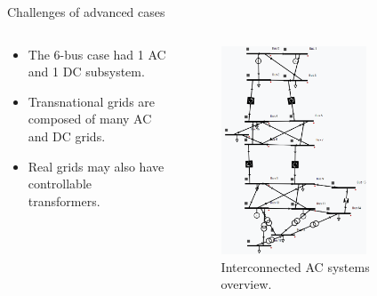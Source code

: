 \begin{frame}{Challenges of advanced cases}
    \begin{columns}
        
        \begin{column}{0.49\textwidth}
            \begin{itemize}
                \item The 6-bus case had 1 AC and 1 DC subsystem.
                \item Transnational grids are composed of many AC and DC grids.
                \item Real grids may also have controllable transformers.
            \end{itemize}
        \end{column}

        \begin{column}{0.5\textwidth}
            \begin{figure}[H]
                \centering
            \includegraphics[width=0.73\textwidth]{Images/17busgui1.png}
            \caption{Interconnected AC systems overview.}
            \label{fig:17bus1}
            \end{figure}
        \end{column}

    \end{columns}

\end{frame}

